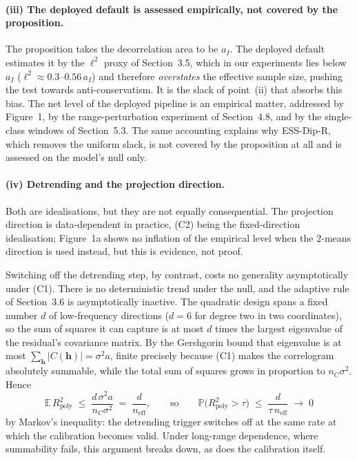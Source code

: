 \documentclass[11pt]{article}
\newcommand{\E}{\mathbb{E}}
\newcommand{\Prob}{\mathbb{P}}
\newcommand{\neff}{n_{\mathrm{eff}}}
\begin{document}
\paragraph{(iii) The deployed default is assessed empirically, not covered by
the proposition.}
The proposition takes the decorrelation area to be $a_I$. The deployed default
estimates it by the $\ell^{2}$ proxy of Section~3.5, which in our experiments
lies below $a_I$ ($\ell^{2}\approx0.3$--$0.56\,a_I$) and therefore
\emph{overstates} the effective sample size, pushing the test towards
anti-conservatism. It is the slack of point~(ii) that absorbs this bias. The
net level of the deployed pipeline is an empirical matter, addressed by
Figure~1, by the range-perturbation experiment of Section~4.8, and by the
single-class windows of Section~5.3. The same accounting explains why
ESS-Dip-R, which removes the uniform slack, is not covered by the proposition
at all and is assessed on the model's null only.

\paragraph{(iv) Detrending and the projection direction.}
Both are idealisations, but they are not equally consequential. The projection
direction is data-dependent in practice, (C2) being the fixed-direction
idealisation; Figure~1a shows no inflation of the empirical level when the
$2$-means direction is used instead, but this is evidence, not proof.

Switching off the detrending step, by contrast, costs no generality
asymptotically under (C1). There is no deterministic trend under the null, and
the adaptive rule of Section~3.6 is asymptotically inactive. The quadratic
design spans a fixed number $d$ of low-frequency directions ($d=6$ for degree
two in two coordinates), so the sum of squares it can capture is at most $d$
times the largest eigenvalue of the residual's covariance matrix. By the
Gershgorin bound that eigenvalue is at most
$\sum_{\bm h}\lvert C(\bm h)\rvert=\sigma^{2}a$, finite precisely because (C1)
makes the correlogram absolutely summable, while the total sum of squares grows
in proportion to $n_C\sigma^{2}$. Hence
\begin{equation}\label{eq:r2rate}
  \E\,R^{2}_{\mathrm{poly}}\;\le\;\frac{d\,\sigma^{2}a}{n_C\sigma^{2}}
  \;=\;\frac{d}{\neff},
  \qquad\text{so}\qquad
  \Prob\bigl(R^{2}_{\mathrm{poly}}>\tau\bigr)\;\le\;\frac{d}{\tau\,\neff}
  \;\longrightarrow\;0
\end{equation}
by Markov's inequality: the detrending trigger switches off at the same rate at
which the calibration becomes valid. Under long-range dependence, where
summability fails, this argument breaks down, as does the calibration itself.
\end{document}
